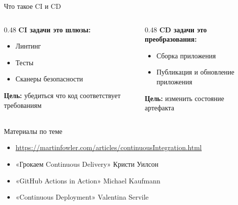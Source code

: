 \documentclass[aspectratio=169]{beamer}
\begin{document}
    \begin{frame}{Что такое CI и CD}
        \begin{columns}[t]
            \begin{column}[t]{0.48\textwidth}
                \textbf{CI задачи это шлюзы:}
                \begin{itemize}
                    \item Линтинг
                    \item Тесты
                    \item Сканеры безопасности
                \end{itemize}
                
                \vspace{0.3cm}
                \textbf{Цель:} убедиться что код соответствует требованиям
            \end{column}
            
            \begin{column}[t]{0.48\textwidth}
                \textbf{CD задачи это преобразования:}
                \begin{itemize}
                    \item Сборка приложения
                    \item Публикация и обновление приложения
                \end{itemize}
                
                \vspace{0.3cm}
                \textbf{Цель:} изменить состояние артефакта
            \end{column}
        \end{columns}
    \end{frame}


    \begin{frame}{Материалы по теме}
        \begin{itemize}
            \item \url{https://martinfowler.com/articles/continuousIntegration.html}
            \item «Грокаем Continuous Delivery» Кристи Уилсон
            \item «GitHub Actions in Action» Michael Kaufmann
            \item «Continuous Deployment» Valentina Servile
        \end{itemize}
    \end{frame}
\end{document}
